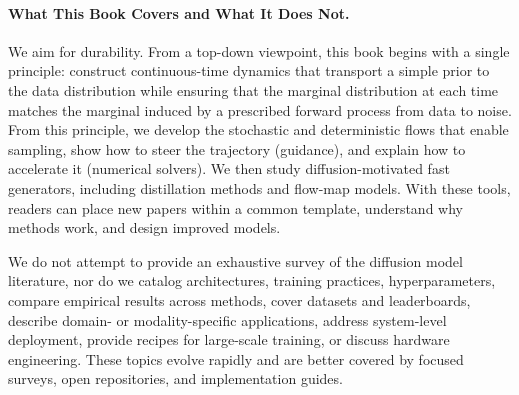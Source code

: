 



\paragraph{What This Book Covers and What It Does Not.}
We aim for durability. From a top-down viewpoint, this book begins with a single principle: construct continuous-time dynamics that transport a simple prior to the data distribution while ensuring that the marginal distribution at each time matches the marginal induced by a prescribed forward process from data to noise. From this principle, we develop the stochastic and deterministic flows that enable sampling, show how to steer the trajectory (guidance), and explain how to accelerate it (numerical solvers). We then study diffusion-motivated fast generators, including distillation methods and flow-map models. With these tools, readers can place new papers within a common template, understand why methods work, and design improved models.

We do not attempt to provide an exhaustive survey of the diffusion model literature, nor do we catalog architectures, training practices, hyperparameters, compare empirical results across methods, cover datasets and leaderboards, describe domain- or modality-specific applications, address system-level deployment, provide recipes for large-scale training, or discuss hardware engineering. These topics evolve rapidly and are better covered by focused surveys, open repositories, and implementation guides.




